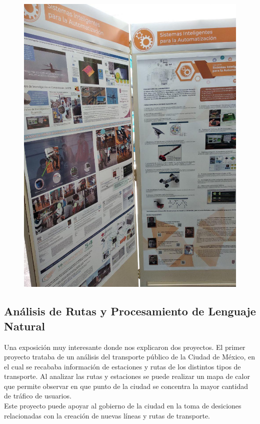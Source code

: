 \documentclass[11pt,letterpaper]{article}
\begin{document}
\begin{figure}[H]
	\centering
	\includegraphics[scale = 0.4]{images/sismo2}
\end{figure}

\subsection*{Análisis de Rutas y Procesamiento de Lenguaje Natural}
Una exposición muy interesante donde nos explicaron dos proyectos.
El primer proyecto trataba de un análisis del transporte público de la Ciudad de México, en el cual se recababa información de estaciones y rutas de los distintos tipos de transporte. Al analizar las rutas y estaciones se puede realizar un mapa de calor que permite observar en que punto de la ciudad se concentra la mayor cantidad de tráfico de usuarios. \\

Este proyecto puede apoyar al gobierno de la ciudad en la toma de desiciones relacionadas con la creación de nuevas líneas y rutas de transporte.\\
\end{document}
